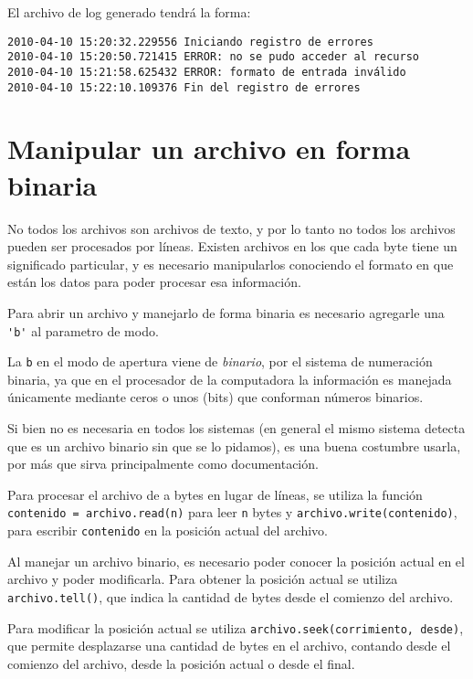 El archivo de log generado tendrá la forma:

\begin{verbatim}
2010-04-10 15:20:32.229556 Iniciando registro de errores
2010-04-10 15:20:50.721415 ERROR: no se pudo acceder al recurso
2010-04-10 15:21:58.625432 ERROR: formato de entrada inválido
2010-04-10 15:22:10.109376 Fin del registro de errores
\end{verbatim}

\section{Manipular un archivo en forma binaria}

No todos los archivos son archivos de texto, y por lo tanto no todos los
archivos pueden ser procesados por líneas. Existen archivos en los que cada
byte tiene un significado particular, y es necesario manipularlos conociendo
el formato en que están los datos para poder procesar esa información.

Para abrir un archivo y manejarlo de forma binaria es necesario agregarle
una \verb!'b'! al parametro de modo.

\begin{sabias_que}
La \texttt{b} en el modo de apertura viene de \textit{binario}, por el
sistema de numeración binaria, ya que en el procesador de la computadora la
información es manejada únicamente mediante ceros o unos (bits) que
conforman números binarios.

Si bien no es necesaria en todos los sistemas (en general el mismo sistema
detecta que es un archivo binario sin que se lo pidamos), es una buena
costumbre usarla, por más que sirva principalmente como documentación.
\end{sabias_que}

Para procesar el archivo de a bytes en lugar de líneas, se utiliza la
función \lstinline!contenido = archivo.read(n)! para leer \lstinline!n!
bytes y \lstinline!archivo.write(contenido)!, para
escribir \lstinline!contenido! en la posición actual del archivo.

Al manejar un archivo binario, es necesario poder conocer la
posición actual en el archivo y poder modificarla. Para obtener la
posición actual se utiliza \lstinline!archivo.tell()!, que
indica la cantidad de bytes desde el comienzo del archivo.

Para modificar la posición actual se utiliza
\lstinline!archivo.seek(corrimiento, desde)!, que permite desplazarse una
cantidad de bytes en el archivo, contando desde el comienzo del archivo,
desde la posición actual o desde el final.

